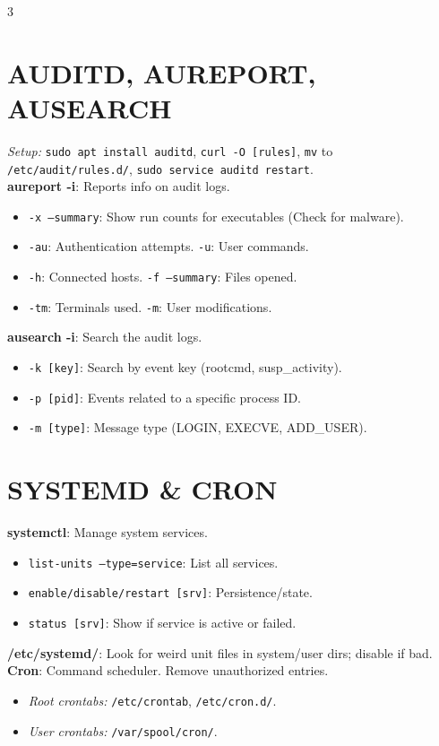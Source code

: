 \documentclass[7pt,landscape]{article}
\begin{document}
\begin{multicols*}{3}
\section{AUDITD, AUREPORT, AUSEARCH}
\textit{Setup:} \texttt{sudo apt install auditd}, \texttt{curl -O [rules]}, \texttt{mv} to \texttt{/etc/audit/rules.d/}, \texttt{sudo service auditd restart}. \\
\textbf{aureport -i}: Reports info on audit logs.
\begin{itemize}
    \item \texttt{-x --summary}: Show run counts for executables (Check for malware).
    \item \texttt{-au}: Authentication attempts. \texttt{-u}: User commands.
    \item \texttt{-h}: Connected hosts. \texttt{-f --summary}: Files opened.
    \item \texttt{-tm}: Terminals used. \texttt{-m}: User modifications.
\end{itemize}
\textbf{ausearch -i}: Search the audit logs.
\begin{itemize}
    \item \texttt{-k [key]}: Search by event key (rootcmd, susp\_activity).
    \item \texttt{-p [pid]}: Events related to a specific process ID.
    \item \texttt{-m [type]}: Message type (LOGIN, EXECVE, ADD\_USER).
\end{itemize}

\section{SYSTEMD \& CRON}
\textbf{systemctl}: Manage system services.
\begin{itemize}
    \item \texttt{list-units --type=service}: List all services.
    \item \texttt{enable/disable/restart [srv]}: Persistence/state.
    \item \texttt{status [srv]}: Show if service is active or failed.
\end{itemize}
\textbf{/etc/systemd/}: Look for weird unit files in system/user dirs; disable if bad. \\
\textbf{Cron}: Command scheduler. Remove unauthorized entries.
\begin{itemize}
    \item \textit{Root crontabs:} \texttt{/etc/crontab}, \texttt{/etc/cron.d/}.
    \item \textit{User crontabs:} \texttt{/var/spool/cron/}.
\end{itemize}


\end{multicols*}
\end{document}

